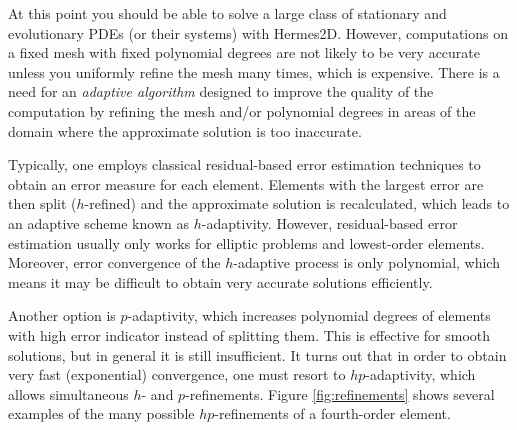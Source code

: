 At this point you should be able to solve a large class of stationary and evolutionary PDEs
(or their systems) with Hermes2D. However, computations on a fixed mesh with fixed
polynomial degrees are not likely to be very accurate unless you uniformly refine the mesh
many times, which is expensive. There is a need for an {\it adaptive algorithm} designed
to improve the quality of the computation by refining the mesh and/or polynomial degrees
in areas of the domain where the approximate solution is too inaccurate.

Typically, one employs classical residual-based error estimation techniques to obtain an
error measure for each element. Elements with the largest error are then split ($h$-refined)
and the approximate solution is recalculated, which leads to an adaptive scheme known as
$h$-adaptivity. However, residual-based error estimation usually only works for elliptic
problems and lowest-order elements. Moreover, error convergence of the $h$-adaptive process
is only polynomial, which means it may be difficult to obtain very accurate solutions efficiently.

Another option is $p$-adaptivity, which increases polynomial degrees of elements with high
error indicator instead of splitting them. This is effective for smooth solutions, but in
general it is still insufficient. It turns out that in order to obtain very fast (exponential)
convergence, one must resort to $hp$-adaptivity, which allows simultaneous $h$- and $p$-refinements.
Figure \ref{fig:refinements} shows several examples of the many possible $hp$-refinements of
a fourth-order element.

